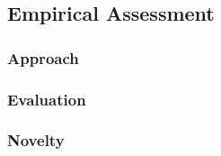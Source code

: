 

\subsection{Empirical Assessment}



\subsubsection{Approach}



\subsubsection{Evaluation}



\subsubsection{Novelty}
